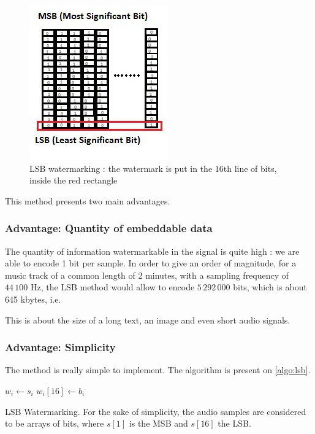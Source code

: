 \begin{figure}[h!]
\centering
\includegraphics{images/LSB2.jpg}
\caption{LSB watermarking : the watermark is put in the $16$th line of bits, inside the red rectangle}
\label{fig:lsb}
\end{figure}

This method presents two main advantages. 
\subsubsection{Advantage: Quantity of embeddable data}
The quantity of information watermarkable in the signal is quite high : we are able to encode 1 bit per sample. In order to give an order of magnitude, for a music track of a common length of 2 minutes, with a sampling frequency of $44\,100$ Hz, the \ac{LSB} method would allow to encode $5\,292\,000$ bits, which is about 645 kbytes, i.e.

This is about the size of a long text, an image and even short audio signals. 
\subsubsection{Advantage: Simplicity}
The method is really simple to implement.
The algorithm is present on \ref{algo:lsb}.

\begin{algorithm}
\DontPrintSemicolon
{}

 {

  $w_i \gets s_i$ \;  
  $w_i [16] \gets b_i$ \;

}

\;

\caption{\ac{LSB} Watermarking. For the sake of simplicity, the audio samples are considered to be arrays of bits, where $s[1]$ is the \ac{MSB} and $s[16]$ the \ac{LSB}.}

\label{algo:lsb}

\end{algorithm}

